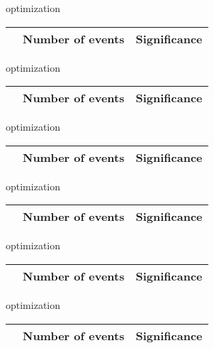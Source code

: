 \begin{frame}{optimization}
\tiny

\begin{tabular}{|c|c|c|}
\hline
& Number of events & Significance \\
\hline

\end{tabular}
\end{frame}

\begin{frame}{optimization}
\tiny

\begin{tabular}{|c|c|c|}
\hline
& Number of events & Significance \\
\hline

\end{tabular}
\end{frame}

\begin{frame}{optimization}
\tiny

\begin{tabular}{|c|c|c|}
\hline
& Number of events & Significance \\
\hline

\end{tabular}
\end{frame}

\begin{frame}{optimization}
\tiny

\begin{tabular}{|c|c|c|}
\hline
& Number of events & Significance \\
\hline

\end{tabular}
\end{frame}

\begin{frame}{optimization}
\tiny

\begin{tabular}{|c|c|c|}
\hline
& Number of events & Significance \\
\hline

\end{tabular}
\end{frame}

\begin{frame}{optimization}
\tiny

\begin{tabular}{|c|c|c|}
\hline
& Number of events & Significance \\
\hline

\end{tabular}
\end{frame}

